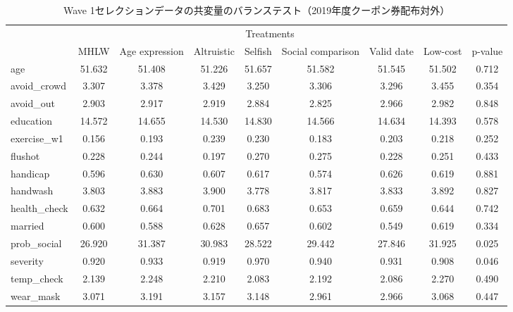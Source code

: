 \documentclass[
  11pt,
  a4paper,
]{article}
\begin{document}
\begin{table}

\caption{\label{tab:show-int-coupon0-balance}Wave 1セレクションデータの共変量のバランステスト（2019年度クーポン券配布対外）}
\centering
\begin{tabular}[t]{lcccccccc}
\toprule
\multicolumn{1}{c}{ } & \multicolumn{7}{c}{Treatments} & \multicolumn{1}{c}{ } \\
\cmidrule(l{3pt}r{3pt}){2-8}
  & MHLW & Age expression & Altruistic & Selfish & Social comparison & Valid date & Low-cost & p-value\\
\midrule
age & 51.632 & 51.408 & 51.226 & 51.657 & 51.582 & 51.545 & 51.502 & 0.712\\
avoid\_crowd & 3.307 & 3.378 & 3.429 & 3.250 & 3.306 & 3.296 & 3.455 & 0.354\\
avoid\_out & 2.903 & 2.917 & 2.919 & 2.884 & 2.825 & 2.966 & 2.982 & 0.848\\
education & 14.572 & 14.655 & 14.530 & 14.830 & 14.566 & 14.634 & 14.393 & 0.578\\
exercise\_w1 & 0.156 & 0.193 & 0.239 & 0.230 & 0.183 & 0.203 & 0.218 & 0.252\\
flushot & 0.228 & 0.244 & 0.197 & 0.270 & 0.275 & 0.228 & 0.251 & 0.433\\
handicap & 0.596 & 0.630 & 0.607 & 0.617 & 0.574 & 0.626 & 0.619 & 0.881\\
handwash & 3.803 & 3.883 & 3.900 & 3.778 & 3.817 & 3.833 & 3.892 & 0.827\\
health\_check & 0.632 & 0.664 & 0.701 & 0.683 & 0.653 & 0.659 & 0.644 & 0.742\\
married & 0.600 & 0.588 & 0.628 & 0.657 & 0.602 & 0.549 & 0.619 & 0.334\\
prob\_social & 26.920 & 31.387 & 30.983 & 28.522 & 29.442 & 27.846 & 31.925 & 0.025\\
severity & 0.920 & 0.933 & 0.919 & 0.970 & 0.940 & 0.931 & 0.908 & 0.046\\
temp\_check & 2.139 & 2.248 & 2.210 & 2.083 & 2.192 & 2.086 & 2.270 & 0.490\\
wear\_mask & 3.071 & 3.191 & 3.157 & 3.148 & 2.961 & 2.966 & 3.068 & 0.447\\
\bottomrule
\end{tabular}
\end{table}
\end{document}
